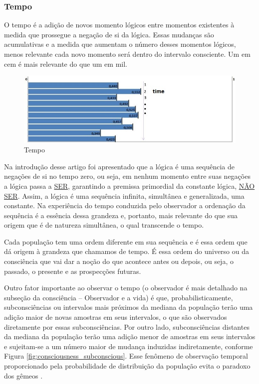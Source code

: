 \subsubsection{Tempo}
O tempo é a adição de novos momento lógicos entre momentos existentes à medida que prossegue a negação de si da lógica. Essas mudanças são acumulativas e a medida que aumentam o número desses momentos lógicos, menos relevante cada novo momento será dentro do intervalo consciente. Um em cem é mais relevante do que um em mil. 
	\begin{figure}[H]
	\caption{Tempo}
	\label{fig:consciousness_time}
	\centering
	\includegraphics[scale=.8]{sections/images/consciousness_time.jpg}
	\end{figure}

Na introdução desse artigo foi apresentado que a lógica é uma sequência de negações de si no tempo zero, ou seja, em nenhum momento entre suas negações a lógica passa a \underline{SER}, garantindo a premissa primordial da constante lógica, \underline{NÃO SER}. Assim, a lógica é uma sequência infinita, simultânea e generalizada, uma constante. Na experiência do tempo conduzida pelo observador a ordenação da sequência é a essência dessa grandeza e, portanto, mais relevante do que sua origem que é de natureza simultânea, o qual transcende o tempo.

Cada população tem uma ordem diferente em sua sequência e é essa ordem que dá origem à grandeza que chamamos de tempo. É essa ordem do universo ou da consciência que vai dar a noção do que acontece antes ou depois, ou seja, o passado, o presente e as prospecções futuras.

Outro fator importante ao observar o tempo (o observador é mais detalhado na subseção da consciência – Observador e a vida) é que, probabilisticamente, subconsciências ou intervalos mais próximos da mediana da população terão uma adição maior de novas amostras em seus intervalos, o que são observados diretamente por essas subconsciências. Por outro lado, subconsciências distantes da mediana da população terão uma adição menor de amostras em seus intervalos e sujeitam-se a um número maior de mudança induzidas indiretamente, conforme Figura \ref{fig:consciousness_subconscious}. Esse fenômeno de observação temporal proporcionado pela probabilidade de distribuição da população evita o paradoxo dos gêmeos \cite{brasilescola_paradoxo_gemeos}.

